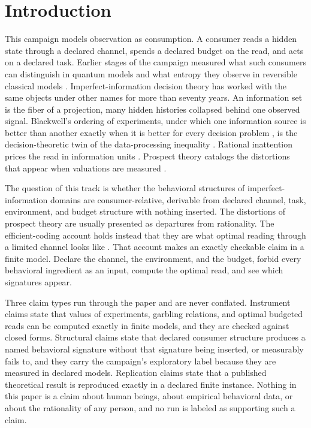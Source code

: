 \documentclass[aps,pre,reprint,nofootinbib]{revtex4-2}
\begin{document}
\maketitle

\section{Introduction}
\label{sec:intro}

This campaign models observation as consumption.  A consumer reads a
hidden state through a declared channel, spends a declared budget on
the read, and acts on a declared task.  Earlier stages of the
campaign measured what such consumers can distinguish in quantum
models \cite{QuantumPaper} and what entropy they observe in
reversible classical models \cite{SourcesPaper}.  Imperfect-information
decision theory has worked with the same objects under other names
for more than seventy years.  An information set is the fiber of a
projection,
many hidden histories collapsed behind one observed signal.
Blackwell's ordering of experiments, under which one information
source is better than another exactly when it is better for every
decision problem \cite{Blackwell1953}, is the decision-theoretic twin
of the data-processing inequality \cite{CoverThomas2006}.  Rational
inattention prices the read in information units \cite{Sims2003,
MatejkaMcKay2015}.  Prospect theory catalogs the distortions that
appear when valuations are measured \cite{KahnemanTversky1979,
TverskyKahneman1992}.

The question of this track is whether the behavioral structures of
imperfect-information domains are consumer-relative, derivable from
declared channel, task, environment, and budget structure with
nothing inserted.  The distortions of prospect theory are usually
presented as departures from rationality.  The efficient-coding
account holds instead that they are what optimal reading through a
limited channel looks like \cite{ZhangMaloney2012, FrydmanJin2022}.
That account makes an exactly checkable claim in a finite model.
Declare the channel, the environment, and the budget, forbid every
behavioral ingredient as an input, compute the optimal read, and see
which signatures appear.

Three claim types run through the paper and are never conflated.
Instrument claims state that values of experiments, garbling
relations, and optimal budgeted reads can be computed exactly in
finite models, and they are checked against closed forms.  Structural
claims state that declared consumer structure produces a named
behavioral signature without that signature being inserted, or
measurably fails to, and they carry the campaign's exploratory label
because they are measured in declared models.  Replication claims
state that a published theoretical result is reproduced exactly in a
declared finite instance.  Nothing in this paper is a claim about
human beings, about empirical behavioral data, or about the
rationality of any person, and no run is labeled as supporting such a
claim.
\end{document}

